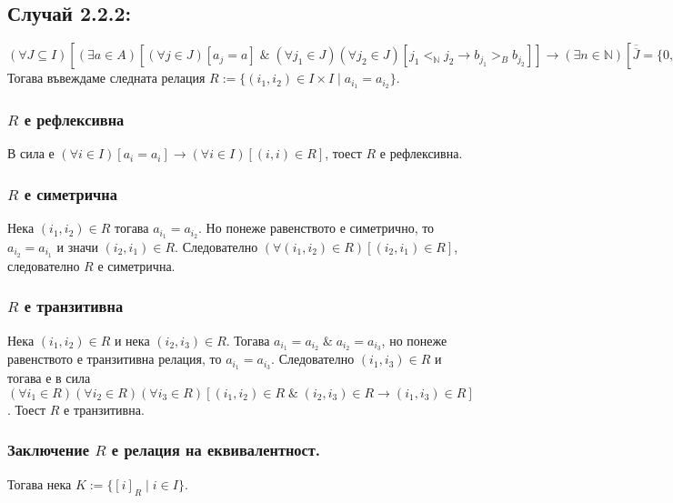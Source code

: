 \documentclass[a4paper, 12pt, oneside]{article}
\begin{document}
\subsection*{Случай 2.2.2:}
\((\forall J \subseteq I)[(\exists a \in A)[(\forall j \in J)[a_j = a] \; \& \; (\forall j_1 \in J)(\forall j_2 \in J)[j_1 <_{\mathbb{N}} j_2 \longrightarrow b_{j_1} >_B b_{j_2}]] \longrightarrow (\exists n \in \mathbb{N})[\overline{\overline{J}} = \overline{\overline{\{0, 1, \dots, n - 1\}}}]]\) \\
Тогава въвеждаме следната релация \(R := \{(i_1, i_2) \in I \times I \; | \; a_{i_1} = a_{i_2}\}\). \\
\subsubsection*{\(R\) е рефлексивна}
В сила е \((\forall i \in I)[a_i = a_i] \longrightarrow (\forall i \in I)[(i, i) \in R]\), тоест \(R\) е рефлексивна.
\subsubsection*{\(R\) е симетрична}
Нека \((i_1, i_2) \in R\) тогава \(a_{i_1} = a_{i_2}\). Но понеже равенството е симетрично, то \(a_{i_2} = a_{i_1}\) и значи \((i_2, i_1) \in R\).
Следователно \((\forall (i_1, i_2) \in R)[(i_2, i_1) \in R]\), следователно \(R\) е симетрична.
\subsubsection*{\(R\) е транзитивна}
Нека \((i_1, i_2) \in R\) и нека \((i_2, i_3) \in R\).
Тогава \(a_{i_1} = a_{i_2} \; \& \; a_{i_2} = a_{i_3}\), но понеже равенството е транзитивна релация, то \(a_{i_1} = a_{i_3}\).
Следователно \((i_1, i_3) \in R\) и тогава е в сила \((\forall i_1 \in R)(\forall i_2 \in R)(\forall i_3 \in R)[(i_1, i_2) \in R \; \& \; (i_2, i_3) \in R \longrightarrow (i_1, i_3) \in R]\).
Тоест \(R\) е транзитивна. 
\subsubsection*{Заключение \(R\) е релация на еквивалентност.}
Тогава нека \(K := \{[i]_R \; | \; i \in I\}\).
\end{document}
